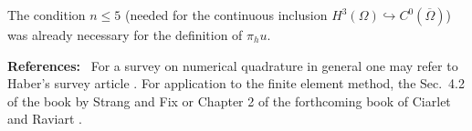 \begin{remark}\label{chap8-rem8.5}
The condition $n\leq 5$ (needed for the continuous inclusion
$H^{3}(\Omega)\hookrightarrow C^{0}(\overline{\Omega})$) was already
necessary for the definition of $\pi_{h}u$.
\end{remark}

\noindent
{\bf References:}~ For a survey on numerical quadrature in general one
may refer to Haber's survey article \cite{key13}. For application to
the finite element method, the Sec.~4.2 of the book by Strang and Fix
\cite{key22} or Chapter 2 of the forthcoming book of Ciarlet and
Raviart \cite{key5}. 
